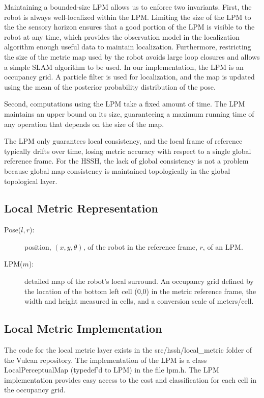 \documentclass{article}
\begin{document}
Maintaining a bounded-size LPM allows us to enforce two invariants. First, the robot is always well-localized within
the LPM. Limiting the size of the LPM to the the sensory horizon ensures that a good portion of the LPM is visible to
the robot at any time, which provides the observation model in the localization algorithm enough useful data to maintain
localization. Furthermore, restricting the size of the metric map used by the robot avoids large loop closures and
allows a simple SLAM algorithm to be used. In our implementation, the LPM is an occupancy grid. A particle filter is
used for localization, and the map is updated using the mean of the posterior probability distribution of the pose.

Second, computations using the LPM take a fixed amount of time. The LPM maintains an upper bound on its size,
guaranteeing a maximum running time of any operation that depends on the size of the map.

The LPM only guarantees local consistency, and the local frame of reference typically drifts over time, losing
metric accuracy with respect to a single global reference frame. For the HSSH, the lack of global consistency is not a
problem because global map consistency is maintained topologically in the global topological layer.

\subsection{Local Metric Representation}

\begin{description}
    \item[Pose($l,r$):] position, $(x,y,\theta)$, of the robot in the reference frame, $r$, of an LPM.

    \item[LPM($m$):] detailed map of the robot's local surround. An occupancy grid defined by the location of
    the bottom left cell (0,0) in the metric reference frame, the width and height measured in cells, and a conversion
    scale of meters/cell.
\end{description}

\subsection{Local Metric Implementation}
The code for the local metric layer exists in the src/hssh/local\_metric folder of the Vulcan repository. The
implementation of the LPM is a class LocalPerceptualMap (typedef'd to LPM) in the file lpm.h. The LPM implementation
provides easy access to the cost and classification for each cell in the occupancy grid.
\end{document}
